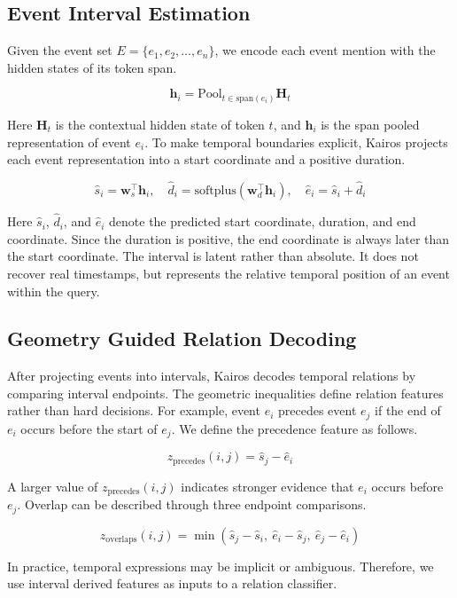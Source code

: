 \documentclass[11pt]{article}
\newcommand{\method}{Kairos}
\begin{document}
\subsection{Event Interval Estimation}

Given the event set \(E = \{e_1, e_2, \ldots, e_n\}\), we encode each event mention with the hidden states of its token span.

$$
\mathbf{h}_i =
\mathrm{Pool}_{t \in \mathrm{span}(e_i)} \mathbf{H}_t
$$

Here \(\mathbf{H}_t\) is the contextual hidden state of token \(t\), and \(\mathbf{h}_i\) is the span pooled representation of event \(e_i\). To make temporal boundaries explicit, \method{} projects each event representation into a start coordinate and a positive duration.

$$
\hat{s}_i = \mathbf{w}_s^\top \mathbf{h}_i,
\quad
\hat{d}_i = \mathrm{softplus}(\mathbf{w}_d^\top \mathbf{h}_i),
\quad
\hat{e}_i = \hat{s}_i + \hat{d}_i
$$

Here \(\hat{s}_i\), \(\hat{d}_i\), and \(\hat{e}_i\) denote the predicted start coordinate, duration, and end coordinate. Since the duration is positive, the end coordinate is always later than the start coordinate. The interval is latent rather than absolute. It does not recover real timestamps, but represents the relative temporal position of an event within the query.

\subsection{Geometry Guided Relation Decoding}

After projecting events into intervals, \method{} decodes temporal relations by comparing interval endpoints. The geometric inequalities define relation features rather than hard decisions. For example, event \(e_i\) precedes event \(e_j\) if the end of \(e_i\) occurs before the start of \(e_j\). We define the precedence feature as follows.

$$
z_{\mathrm{precedes}}(i,j) = \hat{s}_j - \hat{e}_i
$$

A larger value of \(z_{\mathrm{precedes}}(i,j)\) indicates stronger evidence that \(e_i\) occurs before \(e_j\). Overlap can be described through three endpoint comparisons.

$$
z_{\mathrm{overlaps}}(i,j)
=
\min(\hat{s}_j - \hat{s}_i,\ \hat{e}_i - \hat{s}_j,\ \hat{e}_j - \hat{e}_i)
$$

In practice, temporal expressions may be implicit or ambiguous. Therefore, we use interval derived features as inputs to a relation classifier.
\end{document}
